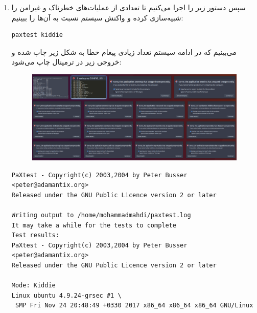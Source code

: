 \documentclass{article}
\begin{document}
\begin{enumerate}
\item سپس دستور زیر را اجرا می‌کنیم تا تعدادی از عملیات‌های خطرناک و غیرامن را شبیه‌سازی کرده و واکنش سیستم نسبت به آن‌ها را ببینیم:
\begin{latin}
\begin{verbatim}
paxtest kiddie
\end{verbatim}
\end{latin}
می‌بینیم که در ادامه سیستم تعداد زیادی پیغام خطا به شکل زیر چاپ شده و خروجی زیر در ترمینال چاپ می‌شود:
\begin{figure}[ht]
	\centering	
	\includegraphics[width = 1\textwidth]{images/23.png}
\end{figure}
\begin{latin}
\begin{verbatim}
PaXtest - Copyright(c) 2003,2004 by Peter Busser <peter@adamantix.org>
Released under the GNU Public Licence version 2 or later

Writing output to /home/mohammadmahdi/paxtest.log
It may take a while for the tests to complete
Test results:
PaXtest - Copyright(c) 2003,2004 by Peter Busser <peter@adamantix.org>
Released under the GNU Public Licence version 2 or later

Mode: Kiddie
Linux ubuntu 4.9.24-grsec #1 \
 SMP Fri Nov 24 20:48:49 +0330 2017 x86_64 x86_64 x86_64 GNU/Linux


\end{verbatim}
\end{latin}
\end{enumerate}
\end{document}
